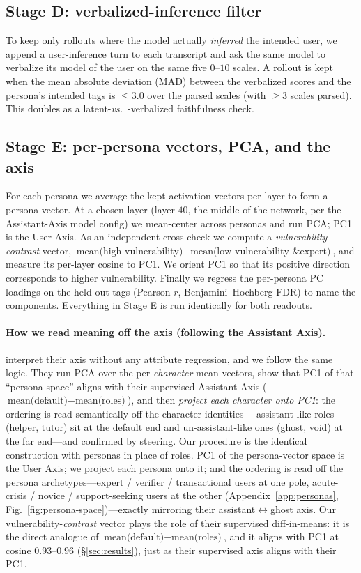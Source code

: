 \documentclass{article}
\newcommand{\vs}{\emph{vs.}\ }
\begin{document}
\subsection{Stage D: verbalized-inference filter}
To keep only rollouts where the model actually \emph{inferred} the intended user,
we append a user-inference turn to each transcript and ask the same model to
verbalize its model of the user on the same five $0$--$10$ scales. A rollout is
kept when the mean absolute deviation (MAD) between the verbalized scores and the
persona's intended tags is $\le 3.0$ over the parsed scales (with $\ge 3$ scales
parsed). This doubles as a latent-\vs-verbalized faithfulness check.

\subsection{Stage E: per-persona vectors, PCA, and the axis}
For each persona we average the kept activation vectors per layer to form a
persona vector. At a chosen layer (layer $40$, the middle of the network, per the
Assistant-Axis model config) we mean-center across personas and run PCA; PC1 is
the User Axis. As an independent cross-check we compute a
\emph{vulnerability-contrast} vector, $\text{mean(high-vulnerability)} -
\text{mean(low-vulnerability \& expert)}$, and measure its per-layer cosine to
PC1. We orient PC1 so that its positive direction corresponds to higher
vulnerability. Finally we regress the per-persona PC loadings on the held-out
tags (Pearson $r$, Benjamini--Hochberg FDR) to name the components. Everything in
Stage E is run identically for both readouts.

\paragraph{How we read meaning off the axis (following the Assistant Axis).}
\citet{lu2024assistant} interpret their axis without any attribute regression, and
we follow the same logic. They run PCA over the per-\emph{character} mean vectors,
show that PC1 of that ``persona space'' aligns with their supervised Assistant Axis
($\text{mean(default)}-\text{mean(roles)}$), and then \emph{project each character
onto PC1}: the ordering is read semantically off the character identities---%
assistant-like roles (helper, tutor) sit at the default end and un-assistant-like
ones (ghost, void) at the far end---and confirmed by steering. Our procedure is the
identical construction with personas in place of roles. PC1 of the persona-vector
space is the User Axis; we project each persona onto it; and the ordering is read
off the persona archetypes---expert / verifier / transactional users at one pole,
acute-crisis / novice / support-seeking users at the other
(Appendix~\ref{app:personas}, Fig.~\ref{fig:persona-space})---exactly mirroring
their assistant$\leftrightarrow$ghost axis. Our vulnerability-\emph{contrast}
vector plays the role of their supervised diff-in-means: it is the direct analogue
of $\text{mean(default)}-\text{mean(roles)}$, and it aligns with PC1 at cosine
$0.93$--$0.96$ (\S\ref{sec:results}), just as their supervised axis aligns with
their PC1.
\end{document}
